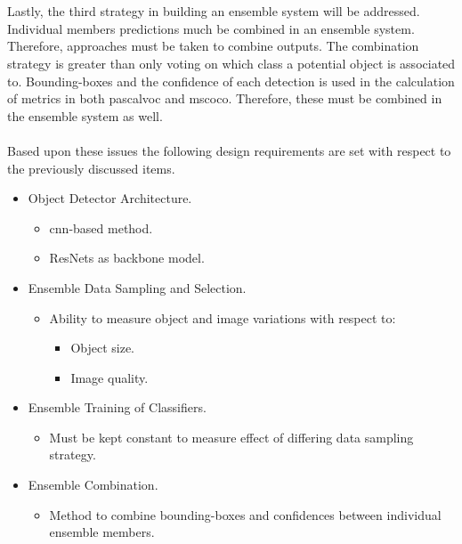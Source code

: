 \documentclass[a4paper,twoside]{article}
\begin{document}
\\\\
Lastly, the third strategy in building an ensemble system will be addressed. Individual members predictions much be combined in an ensemble system. Therefore, approaches must be taken to combine outputs. The combination strategy is greater than only voting on which class a potential object is associated to. Bounding-boxes and the confidence of each detection is used in the calculation of metrics in both \gls{pascalvoc} and \gls{mscoco}. Therefore, these must be combined in the ensemble system as well.
\\\\
Based upon these issues the following design requirements are set with respect to the previously discussed items.

\begin{itemize}
	
	\item Object Detector Architecture.
	\begin{itemize}
		\item \gls{cnn}-based method.
		\item ResNets as backbone model.
	\end{itemize}

	\item Ensemble Data Sampling and Selection.
	\begin{itemize}
		\item Ability to measure object and image variations with respect to: 
		\begin{itemize}
			\item Object size.
			\item Image quality.
		\end{itemize}
	\end{itemize}

	\item Ensemble Training of Classifiers.
	\begin{itemize}
		\item Must be kept constant to measure effect of differing data sampling strategy.
	\end{itemize}

	\item Ensemble Combination.
	\begin{itemize}
		\item Method to combine bounding-boxes and confidences between individual ensemble members.
	\end{itemize}
\end{itemize}
\end{document}
